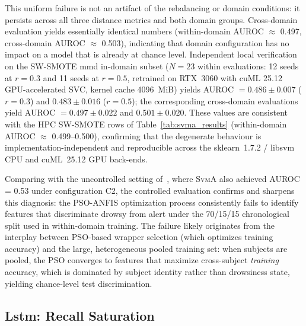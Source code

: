 \documentclass[lettersize,journal]{IEEEtran}
\newcommand{\Impl}[1]{\textsc{#1}}
\begin{document}
This uniform failure is not an artifact of the rebalancing or domain conditions: it persists across all three distance metrics and both domain groups.
Cross-domain evaluation yields essentially identical numbers (within-domain AUROC $\approx$ 0.497, cross-domain AUROC $\approx$ 0.503), indicating that domain configuration has no impact on a model that is already at chance level.
Independent local verification on the SW-SMOTE mmd in-domain subset ($N{=}23$ within evaluations: 12 seeds at $r{=}0.3$ and 11 seeds at $r{=}0.5$, retrained on RTX~3060 with cuML 25.12 GPU-accelerated SVC, kernel cache 4096~MiB) yields AUROC $= 0.486 \pm 0.007$ ($r{=}0.3$) and $0.483 \pm 0.016$ ($r{=}0.5$); the corresponding cross-domain evaluations yield AUROC $= 0.497 \pm 0.022$ and $0.501 \pm 0.020$.
These values are consistent with the HPC SW-SMOTE rows of Table~\ref{tab:svma_results} (within-domain AUROC $\approx$ 0.499--0.500), confirming that the degenerate behaviour is implementation-independent and reproducible across the sklearn~1.7.2 / libsvm CPU and cuML~25.12 GPU back-ends.

Comparing with the uncontrolled setting of~\cite{nakagama2025iv}, where \Impl{SvmA} also achieved AUROC = 0.53 under configuration C2, the controlled evaluation confirms and sharpens this diagnosis: the PSO-ANFIS optimization process consistently fails to identify features that discriminate drowsy from alert under the 70/15/15 chronological split used in within-domain training.
The failure likely originates from the interplay between PSO-based wrapper selection (which optimizes training accuracy) and the large, heterogeneous pooled training set: when subjects are pooled, the PSO converges to features that maximize cross-subject \emph{training} accuracy, which is dominated by subject identity rather than drowsiness state, yielding chance-level test discrimination.

\subsection{Lstm: Recall Saturation}
\label{sec:lstm_results}
\end{document}
